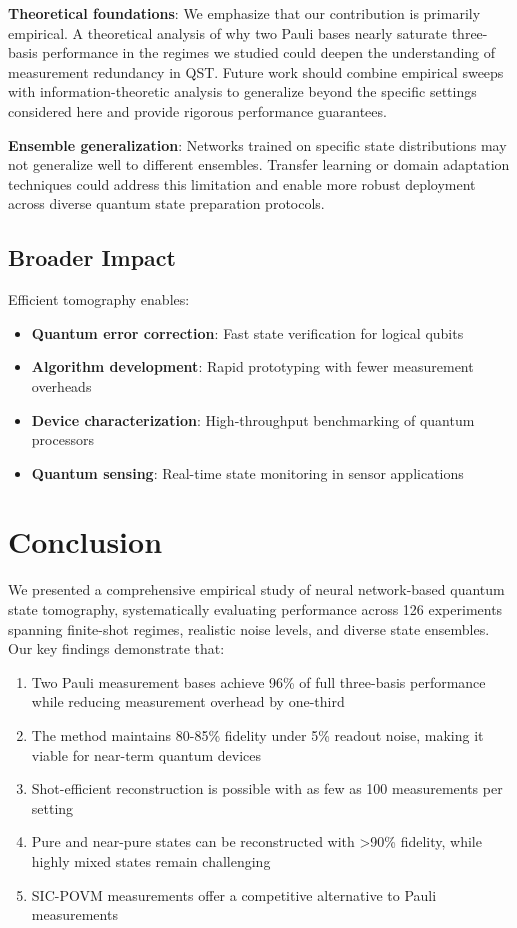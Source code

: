 \documentclass[conference]{IEEEtran}
\begin{document}
\textbf{Theoretical foundations}: We emphasize that our contribution is primarily empirical. A theoretical analysis of why two Pauli bases nearly saturate three-basis performance in the regimes we studied could deepen the understanding of measurement redundancy in QST. Future work should combine empirical sweeps with information-theoretic analysis to generalize beyond the specific settings considered here and provide rigorous performance guarantees.

\textbf{Ensemble generalization}: Networks trained on specific state distributions may not generalize well to different ensembles. Transfer learning or domain adaptation techniques could address this limitation and enable more robust deployment across diverse quantum state preparation protocols.

\subsection{Broader Impact}

Efficient tomography enables:
\begin{itemize}
    \item \textbf{Quantum error correction}: Fast state verification for logical qubits
    \item \textbf{Algorithm development}: Rapid prototyping with fewer measurement overheads
    \item \textbf{Device characterization}: High-throughput benchmarking of quantum processors
    \item \textbf{Quantum sensing}: Real-time state monitoring in sensor applications
\end{itemize}

\section{Conclusion}

We presented a comprehensive empirical study of neural network-based quantum state tomography, systematically evaluating performance across 126 experiments spanning finite-shot regimes, realistic noise levels, and diverse state ensembles. Our key findings demonstrate that:

\begin{enumerate}
    \item Two Pauli measurement bases achieve 96\% of full three-basis performance while reducing measurement overhead by one-third
    \item The method maintains 80-85\% fidelity under 5\% readout noise, making it viable for near-term quantum devices
    \item Shot-efficient reconstruction is possible with as few as 100 measurements per setting
    \item Pure and near-pure states can be reconstructed with >90\% fidelity, while highly mixed states remain challenging
    \item SIC-POVM measurements offer a competitive alternative to Pauli measurements
\end{enumerate}
\end{document}

